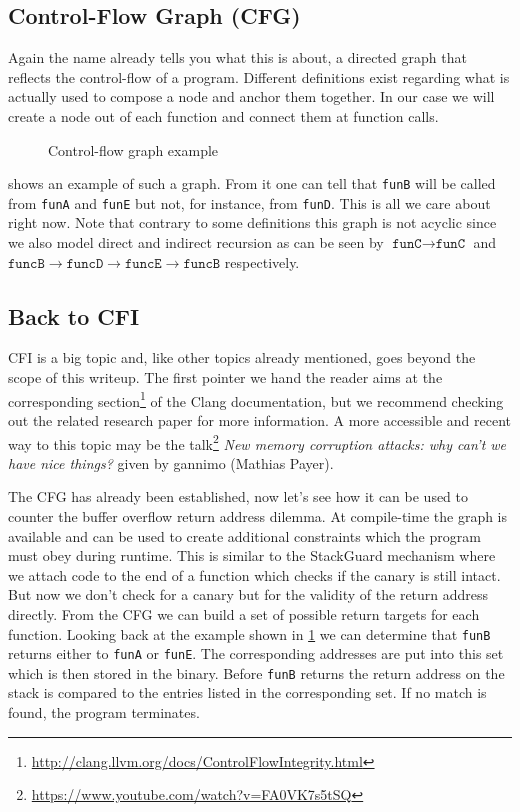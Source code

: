 \documentclass[article]{uibk}
\begin{document}
\subsection{Control-Flow Graph (CFG)}

Again the name already tells you what this is about, a directed graph that
reflects the control-flow of a program. Different definitions exist regarding
what is actually used to compose a node and anchor them together. In our case
we will create a node out of each function and connect them at function calls.

\begin{figure}[H]
    \centering
    
    \caption{Control-flow graph example}
    \label{fig:cfg}
\end{figure}

 shows an example of such a graph. From it one can tell that
\texttt{funB} will be called from \texttt{funA} and \texttt{funE} but not, for
instance, from \texttt{funD}. This is all we care about right now. Note that
contrary to some definitions this graph is not acyclic since we also model
direct and indirect recursion as can be seen by $\texttt{funC} \to
\texttt{funC}$ and $\texttt{funcB} \to \texttt{funcD} \to \texttt{funcE} \to
\texttt{funcB}$ respectively.

\subsection{Back to CFI}

CFI is a big topic and, like other topics already mentioned, goes beyond the
scope of this writeup. The first pointer we hand the reader aims at the
corresponding
section\footnote{\url{http://clang.llvm.org/docs/ControlFlowIntegrity.html}} of
the Clang documentation, but we recommend checking out the related research
paper \cite{ms_cfi} for more information. A more accessible and recent way to
this topic may be the
talk\footnote{\url{https://www.youtube.com/watch?v=FA0VK7s5tSQ}} \textit{New
memory corruption attacks: why can't we have nice things?} given by gannimo
(Mathias Payer).

The CFG has already been established, now let's see how it can be used to
counter the buffer overflow return address dilemma. At compile-time the graph
is available and can be used to create additional constraints which the program
must obey during runtime. This is similar to the StackGuard mechanism where we
attach code to the end of a function which checks if the canary is still
intact. But now we don't check for a canary but for the validity of the return
address directly. From the CFG we can build a set of possible return targets
for each function. Looking back at the example shown in \cref{fig:cfg} we can
determine that \texttt{funB} returns either to \texttt{funA} or \texttt{funE}.
The corresponding addresses are put into this set which is then stored in the
binary. Before \texttt{funB} returns the return address on the stack is
compared to the entries listed in the corresponding set. If no match is found,
the program terminates.
\end{document}
